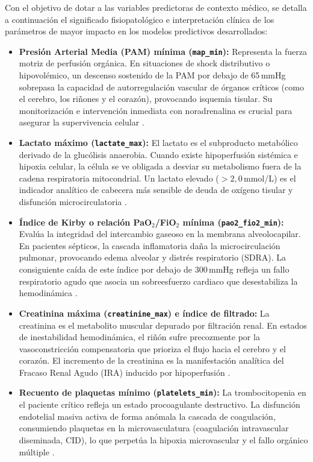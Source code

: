 \documentclass[
  spanish,
  a4paper,
  12pt,
  twoside]{memoir}
\begin{document}
Con el objetivo de dotar a las variables predictoras de contexto médico, se detalla a continuación el significado fisiopatológico e interpretación clínica de los parámetros de mayor impacto en los modelos predictivos desarrollados:

\begin{itemize}
  \item \textbf{Presión Arterial Media (PAM) mínima (\texttt{map\_min}):} Representa la fuerza motriz de perfusión orgánica. En situaciones de shock distributivo o hipovolémico, un descenso sostenido de la PAM por debajo de 65\,mmHg sobrepasa la capacidad de autorregulación vascular de órganos críticos (como el cerebro, los riñones y el corazón), provocando isquemia tisular. Su monitorización e intervención inmediata con noradrenalina es crucial para asegurar la supervivencia celular \cite{evans2021,vincent2013,hubu2025}.
  
  \item \textbf{Lactato máximo (\texttt{lactate\_max}):} El lactato es el subproducto metabólico derivado de la glucólisis anaerobia. Cuando existe hipoperfusión sistémica e hipoxia celular, la célula se ve obligada a desviar su metabolismo fuera de la cadena respiratoria mitocondrial. Un lactato elevado ($> 2,0$\,mmol/L) es el indicador analítico de cabecera más sensible de deuda de oxígeno tisular y disfunción microcirculatoria \cite{singer2016,evans2021,hubu2025}.
  
  \item \textbf{Índice de Kirby o relación PaO$_2$/FiO$_2$ mínima (\texttt{pao2\_fio2\_min}):} Evalúa la integridad del intercambio gaseoso en la membrana alveolocapilar. En pacientes sépticos, la cascada inflamatoria daña la microcirculación pulmonar, provocando edema alveolar y distrés respiratorio (SDRA). La consiguiente caída de este índice por debajo de 300\,mmHg refleja un fallo respiratorio agudo que asocia un sobreesfuerzo cardiaco que desestabiliza la hemodinámica \cite{singer2016,hubu2025}.
  
  \item \textbf{Creatinina máxima (\texttt{creatinine\_max}) e índice de filtrado:} La creatinina es el metabolito muscular depurado por filtración renal. En estados de inestabilidad hemodinámica, el riñón sufre precozmente por la vasoconstricción compensatoria que prioriza el flujo hacia el cerebro y el corazón. El incremento de la creatinina es la manifestación analítica del Fracaso Renal Agudo (IRA) inducido por hipoperfusión \cite{singer2016,hubu2025}.
  
  \item \textbf{Recuento de plaquetas mínimo (\texttt{platelets\_min}):} La trombocitopenia en el paciente crítico refleja un estado procoagulante destructivo. La disfunción endotelial masiva activa de forma anómala la cascada de coagulación, consumiendo plaquetas en la microvasculatura (coagulación intravascular diseminada, CID), lo que perpetúa la hipoxia microvascular y el fallo orgánico múltiple \cite{singer2016,hubu2025}.
\end{itemize}
 
\end{document}
